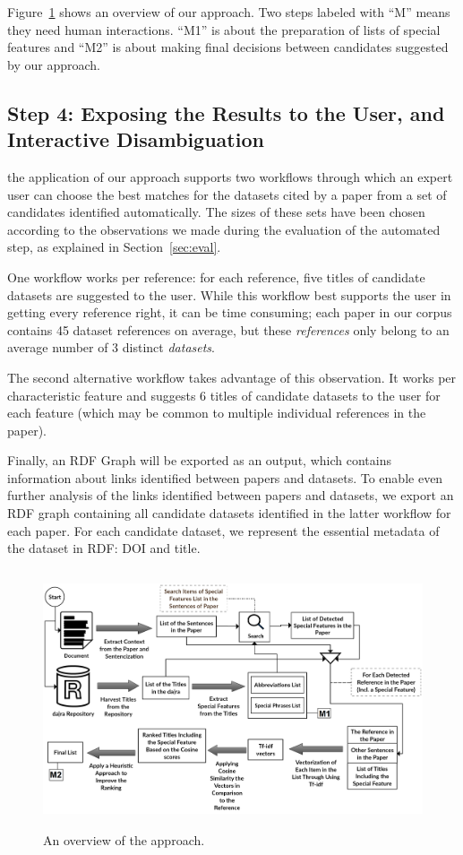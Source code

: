 \documentclass{IOS-Book-Article}
\begin{document}
Figure~\ref{fig:Overview_of_approach} shows an overview of our approach. Two steps labeled with \enquote{M} means they need human interactions. \enquote{M1} is about the preparation of lists of special features and \enquote{M2} is about making final decisions between candidates suggested by our approach.



\subsection{Step 4: Exposing the Results to the User, and Interactive Disambiguation}
\label{sec:expos-results-reus}	
the application of our approach supports two workflows through which an expert user can choose the best matches for the datasets cited by a paper from a set of candidates identified automatically. The sizes of these sets have been chosen according to the observations we made during the evaluation of the automated step, as explained in Section~\ref{sec:eval}.

One workflow works per reference: for each reference, five titles of candidate datasets are suggested to the user. While this workflow best supports the user in getting every reference right, it can be time consuming; each paper in our corpus contains 45 dataset references on average, but these \emph{references} only belong to an average number of 3 distinct \emph{datasets}.

The second alternative workflow takes advantage of this observation. It works per characteristic feature and suggests 6 titles of candidate datasets to the user for each feature (which may be common to multiple individual references in the paper). 

Finally, an RDF Graph will be exported as an output, which contains information about links identified between papers and datasets. To enable even further analysis of the links identified between papers and datasets, we export an RDF graph containing all candidate datasets identified in the latter workflow for each paper. For each candidate dataset, we represent the essential metadata of the dataset in RDF: DOI and title.

\begin{figure}[h]
	\centering
	\includegraphics[height=3in]{Overwveiw_System.png}
	\caption{An overview of the approach.}
	\label{fig:Overview_of_approach}
\end{figure}
\end{document}
